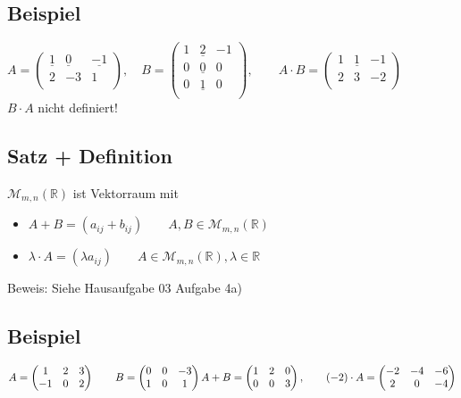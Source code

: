 \documentclass[12pt,titlepage, pdf]{article}
\newcommand{\R}{\mathds{R}}
\newcommand{\uline}[1]{\underline{#1}}
\renewcommand{\>}{\rightarrow}
\renewcommand{\*}{\cdot}
\begin{document}
\subsection{Beispiel}
$A = \begin{pmatrix}
\uline{1} &\uline{0} & \uline{-1}\\
2 & -3 & 1\\
\end{pmatrix},\quad B = \begin{pmatrix}
1 & \uline{2} & -1 \\
0 & \uline{0} & 0\\
0 & \uline{1} & 0 \\
\end{pmatrix}, \qquad
A \cdot B = \begin{pmatrix}
1 & \uline{1} & -1 \\
2 & 3 & -2 \\
\end{pmatrix}$\\
$B\cdot A$ nicht definiert!
\subsection{Satz + Definition}
$\mathcal{M}_{m,n}(\R)$ ist Vektorraum mit 
\begin{itemize}
	\item $A + B = (a_{ij} + b_{ij}) \qquad A,B \in \mathcal{M}_{m,n}(\R)$
	\item $\lambda \cdot A = (\lambda a_{ij})\qquad A \in \mathcal{M}_{m,n}(\R), \lambda \in \R$
\end{itemize}
Beweis: Siehe Hausaufgabe 03 Aufgabe 4a)
\subsection{Beispiel}
$A = \begin{pmatrix}
1 & 2 & 3 \\
-1 & 0 & 2 \\
\end{pmatrix}\qquad B = \begin{pmatrix}
0& 0& -3 \\
1&0&1 \\
\end{pmatrix} \\
A + B = \begin{pmatrix}
1 & 2 & 0 \\
0 & 0 & 3 \\
\end{pmatrix}, \qquad (-2) \cdot A = \begin{pmatrix}
-2 & -4 & -6 \\
2 & 0 & -4 \\
\end{pmatrix}$
\end{document}
